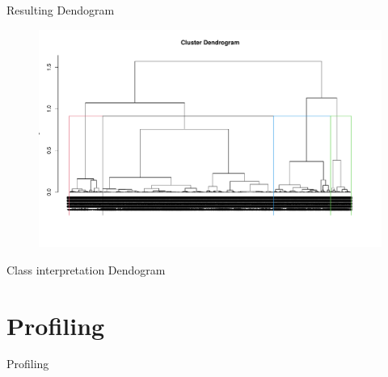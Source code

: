 \begin{frame}{Resulting Dendogram}
\begin{figure}[H]
    \centering
    \includegraphics[width=0.8\linewidth]{cluster-dendo-h3}
    \label{fig:dendogram-final}
\end{figure}
\end{frame}


\begin{frame}{Class interpretation Dendogram}
\end{frame}

\section{Profiling}
\begin{frame}{Profiling}

\begin{columns}
\begin{column}{0.5\textwidth}
\end{column}
\begin{column}{0.5\textwidth}  %
\end{column}
\end{columns}

\end{frame}



